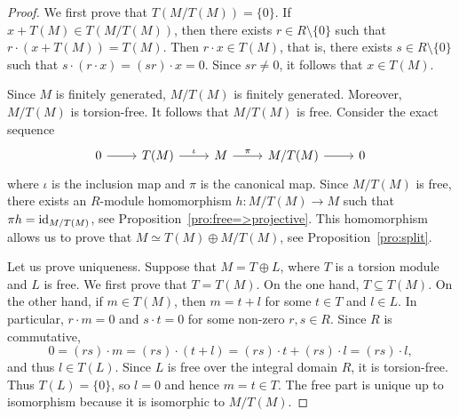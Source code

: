 \begin{proof}
	We first prove that $T(M/T(M))=\{0\}$. If 
	$x+T(M)\in T(M/T(M))$, then there exists $r\in R\setminus\{0\}$ such that 
	$r\cdot (x+T(M))=T(M)$. Then $r\cdot x\in T(M)$, that is, there exists 
	$s\in R\setminus\{0\}$ such that $s\cdot (r\cdot x)=(sr)\cdot x=0$. 
	Since $sr\ne 0$, it follows that $x\in T(M)$. 

	Since $M$ is finitely generated, $M/T(M)$ is finitely generated. Moreover, $M/T(M)$ is torsion-free. 
	It follows that $M/T(M)$ is free. Consider the exact sequence 
	\[
		\begin{tikzcd}
			0 & T(M) & M & M/T(M) & 0
			\arrow[from=1-1, to=1-2]
			\arrow["\iota", from=1-2, to=1-3]
			\arrow["\pi", from=1-3, to=1-4]
			\arrow[from=1-4, to=1-5]
	\end{tikzcd}\]
  where $\iota$ is the inclusion map and $\pi$ is the canonical map.  Since
  $M/T(M)$ is free, there exists an $R$-module homomorphism $h\colon M/T(M)\to
  M$ such that $\pi h=\operatorname{id}_{M/T(M)}$, see
  Proposition~\ref{pro:free=>projective}. This homomorphism allows us to prove
  that $M\simeq T(M)\oplus M/T(M)$, see Proposition~\ref{pro:split}. 
	 
	Let us prove uniqueness. Suppose that $M=T\oplus L$, where 
	$T$ is a torsion module and $L$ is free. We first prove that
	$T=T(M)$. On the one hand,  
	$T\subseteq T(M)$. On the other hand, if $m\in T(M)$, then
	$m=t+l$ for some $t\in T$ and $l\in L$. In particular, 
	$r\cdot m=0$ and $s\cdot t=0$ for some non-zero $r,s\in R$. Since $R$ is commutative, 
	\[
		0=(rs)\cdot m=(rs)\cdot (t+l)=(rs)\cdot t+(rs)\cdot l=(rs)\cdot l,
	\]
	and thus $l\in T(L)$. Since  
	$L$ is free over the integral domain $R$, it is torsion-free. Thus $T(L)=\{0\}$, so 
	$l=0$ and hence  $m=t\in T$. The free part is unique up to isomorphism 
	because it is isomorphic to $M/T(M)$. 
\end{proof}


